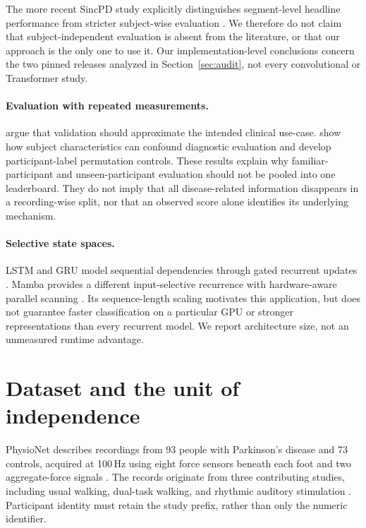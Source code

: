 The more recent SincPD study explicitly distinguishes segment-level headline performance from stricter subject-wise evaluation \citep{salimibadr2026}. We therefore do not claim that subject-independent evaluation is absent from the literature, or that our approach is the only one to use it. Our implementation-level conclusions concern the two pinned releases analyzed in Section~\ref{sec:audit}, not every convolutional or Transformer study.

\paragraph{Evaluation with repeated measurements.}
\citet{saeb2017} argue that validation should approximate the intended clinical use-case. \citet{chaibub2019} show how subject characteristics can confound diagnostic evaluation and develop participant-label permutation controls. These results explain why familiar-participant and unseen-participant evaluation should not be pooled into one leaderboard. They do not imply that all disease-related information disappears in a recording-wise split, nor that an observed score alone identifies its underlying mechanism.

\paragraph{Selective state spaces.}
LSTM and GRU model sequential dependencies through gated recurrent updates \citep{hochreiter1997,cho2014}. Mamba provides a different input-selective recurrence with hardware-aware parallel scanning \citep{gu2024}. Its sequence-length scaling motivates this application, but does not guarantee faster classification on a particular GPU or stronger representations than every recurrent model. We report architecture size, not an unmeasured runtime advantage.

\section{Dataset and the unit of independence}
\label{sec:data}
PhysioNet describes recordings from 93 people with Parkinson's disease and 73 controls, acquired at 100\,Hz using eight force sensors beneath each foot and two aggregate-force signals \citep{hausdorff2008}. The records originate from three contributing studies, including usual walking, dual-task walking, and rhythmic auditory stimulation \citep{frenkel2005,yogev2005,hausdorff2007}. Participant identity must retain the study prefix, rather than only the numeric identifier.

